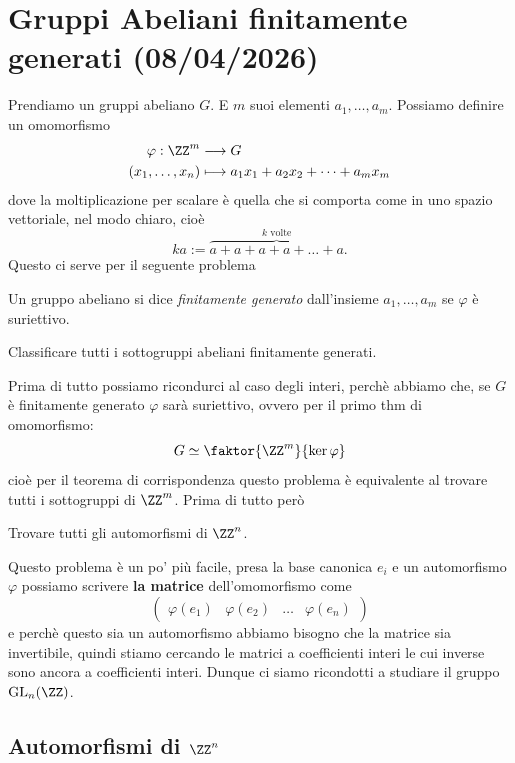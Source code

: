 \documentclass[11pt]{scrartcl}
\begin{document}
	\newpage
	
	\section{Gruppi Abeliani finitamente generati (08/04/2026)}
	
	Prendiamo un gruppi abeliano $G$. E $m$ suoi elementi $a_1,\dots,a_m$. Possiamo definire un omomorfismo 
	\begin{align*}
		\varphi:\ZZ^m & \longrightarrow G \\
		\left(x_1,\dots,x_n\right)& \longmapsto a_1x_1+a_2x_2+\dots+a_mx_m
	\end{align*}
	dove la moltiplicazione per scalare è quella che si comporta come in uno spazio vettoriale, nel modo chiaro, cioè 
	$$ka:=\overset{\text{$k$ volte}}{\overbrace{a+a+a+a+\dots+a}}.$$
	Questo ci serve per il seguente problema
	\begin{definition}
		Un gruppo abeliano si dice \textit{finitamente generato} dall'insieme $a_1,\dots,a_m$ se $\varphi$ è suriettivo.
	\end{definition}
	\begin{problem}
		Classificare tutti i sottogruppi abeliani finitamente generati.
	\end{problem}
	Prima di tutto possiamo ricondurci al caso degli interi, perchè abbiamo che, se $G$ è finitamente generato $\varphi$ sarà suriettivo, ovvero per il primo thm di omomorfismo:
	$$G\simeq \faktor{\ZZ^m}{\ker \varphi}$$
	cioè per il teorema di corrispondenza questo problema è equivalente al trovare tutti i sottogruppi di $\ZZ^m$. Prima di tutto però
	\begin{problem}
		Trovare tutti gli automorfismi di $\ZZ^n$.
	\end{problem}
	Questo problema è un po' più facile, presa la base canonica $e_i$ e un automorfismo $\varphi$ possiamo scrivere \textbf{la matrice} dell'omomorfismo come
	$$
	\left(
	\begin{array}{c|c|c|c}
		\varphi(e_1) & \varphi(e_2) & \dots & \varphi(e_n)   
	\end{array}
	\right)
	$$
	e perchè questo sia un automorfismo abbiamo bisogno che la matrice sia invertibile, quindi stiamo cercando le matrici a coefficienti interi le cui inverse sono ancora a coefficienti interi. Dunque ci siamo ricondotti a studiare il gruppo $\text{GL}_n(\ZZ)$.
	\subsection{Automorfismi di $\ZZ^n$}
	
\end{document}
